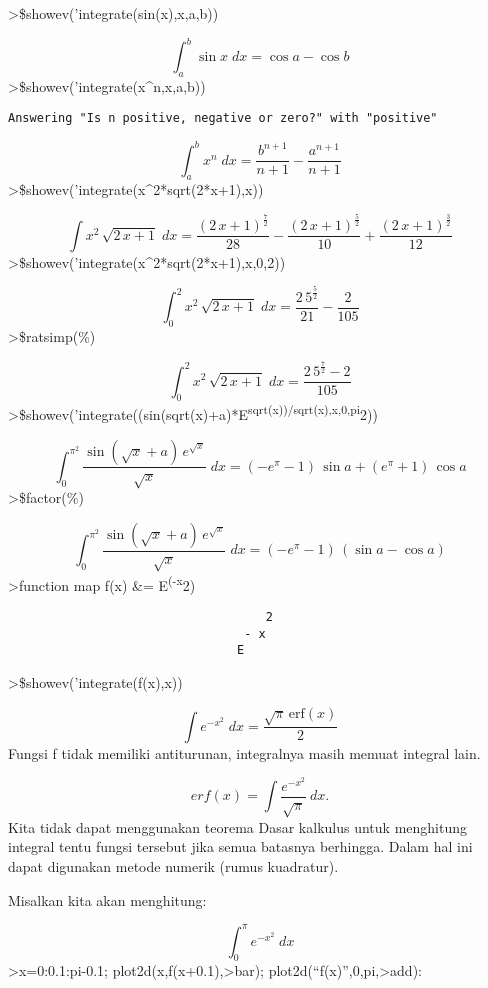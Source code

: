 \documentclass[
]{book}
\begin{document}
\textgreater\$showev('integrate(sin(x),x,a,b))

\[\int_{a}^{b}{\sin x\;dx}=\cos a-\cos b\]\textgreater\$showev('integrate(x\^{}n,x,a,b))

\begin{verbatim}
Answering "Is n positive, negative or zero?" with "positive"
\end{verbatim}

\[\int_{a}^{b}{x^{n}\;dx}=\frac{b^{n+1}}{n+1}-\frac{a^{n+1}}{n+1}\]\textgreater\$showev('integrate(x\^{}2*sqrt(2*x+1),x))

\[\int {x^2\,\sqrt{2\,x+1}}{\;dx}=\frac{\left(2\,x+1\right)^{\frac{7}{2}}}{28}-\frac{\left(2\,x+1\right)^{\frac{5}{2}}}{10}+\frac{\left(2\,x+1\right)^{\frac{3}{2}}}{12}\]\textgreater\$showev('integrate(x\^{}2*sqrt(2*x+1),x,0,2))

\[\int_{0}^{2}{x^2\,\sqrt{2\,x+1}\;dx}=\frac{2\,5^{\frac{5}{2}}}{21}-\frac{2}{105}\]\textgreater\$ratsimp(\%)

\[\int_{0}^{2}{x^2\,\sqrt{2\,x+1}\;dx}=\frac{2\,5^{\frac{7}{2}}-2}{105}\]\textgreater\$showev('integrate((sin(sqrt(x)+a)*E\textsuperscript{sqrt(x))/sqrt(x),x,0,pi}2))

\[\int_{0}^{\pi^2}{\frac{\sin \left(\sqrt{x}+a\right)\,e^{\sqrt{x}}}{\sqrt{x}}\;dx}=\left(-e^{\pi}-1\right)\,\sin a+\left(e^{\pi}+1\right)\,\cos a\]\textgreater\$factor(\%)

\[\int_{0}^{\pi^2}{\frac{\sin \left(\sqrt{x}+a\right)\,e^{\sqrt{x}}}{\sqrt{x}}\;dx}=\left(-e^{\pi}-1\right)\,\left(\sin a-\cos a\right)\]\textgreater function map f(x) \&= E\textsuperscript{(-x}2)

\begin{verbatim}
                                    2
                                 - x
                                E
\end{verbatim}

\textgreater\$showev('integrate(f(x),x))

\[\int {e^ {- x^2 }}{\;dx}=\frac{\sqrt{\pi}\,\mathrm{erf}\left(x\right)}{2}\]Fungsi f tidak memiliki antiturunan, integralnya masih memuat integral lain.

\[erf(x) = \int \frac{e^{-x^2}}{\sqrt{\pi}} \ dx.\]Kita tidak dapat menggunakan teorema Dasar kalkulus untuk menghitung integral tentu fungsi tersebut jika semua batasnya berhingga. Dalam hal ini dapat digunakan metode numerik (rumus kuadratur).

Misalkan kita akan menghitung:

\[\int_{0}^{\pi}{e^ {- x^2 }\;dx}\]\textgreater x=0:0.1:pi-0.1; plot2d(x,f(x+0.1),\textgreater bar); plot2d(``f(x)'',0,pi,\textgreater add):
\end{document}
